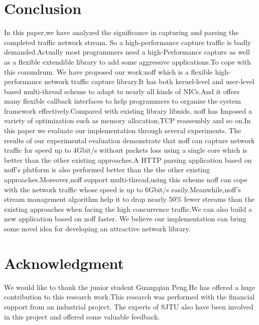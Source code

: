 \documentclass[conference]{IEEEtran}
\begin{document}
\section{Conclusion}
In this paper,we have analyzed the significance in capturing and parsing the completed traffic network stream. So a high-performance capture traffic is badly demanded.Actually most programmers need a high-Performance capture as well as a flexible extendible library to add some aggressive applications.To cope with this conundrum. We have proposed our work:noff which is a flexible high-performance network traffic capture library.It has both kernel-level and user-level based multi-thread scheme to adapt to nearly all kinds of NICs.And it offers many flexible callback interfaces to help programmers to organise the system framework effectively.Compared with existing library libnids, noff has Imposed a variety of optimization such as memory allocation,TCP reassembly and so on.In this paper we evaluate our implementation through several experiments.
\newline\indent The results of our experimental evaluation demonstrate that noff can  capture network traffic for speed up to 4Gbit/s without packets loss using a single core which is better than the other existing approaches.A HTTP parsing application based on noff's platform is also performed better than the the other existing approaches.Moreover,noff support multi-thread,using this scheme noff can cope with the network traffic whose speed is up to 6Gbit/s easily.Meanwhile,noff's stream management algorithm help it to drop nearly 50\% fewer streams than the existing approaches when facing the high concurrence traffic.We can also build a new application based on noff faster.
\newline\indent We believe our implementation can bring some novel idea for developing an
attractive network library. 





\section*{Acknowledgment}

We would like to thank the junior student Guangqian Peng.He has offered a huge contribution to this research work.This research was performed with the financial support from an industrial project. The experts of SJTU also have been involved in this project and offered some valuable feedback.
\end{document}

